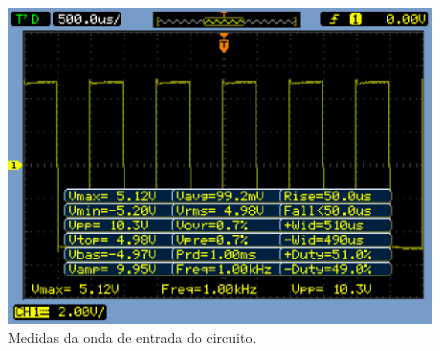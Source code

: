 \documentclass[a4paper]{article} %
\begin{document}
\begin{figure}[h!]
\begin{centering}
\par\end{centering}
\end{figure}


\begin{figure}[h!]
\begin{centering}
\includegraphics[scale=0.55]{Imagens/3.4duplicador_tensao/Vinmedidas}
\par\end{centering}
\caption{ Medidas da onda de entrada do circuito. \label{fig:dob}}
\end{figure}
\end{document}
